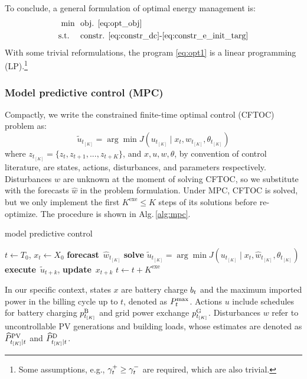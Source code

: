 To conclude, a general formulation of optimal energy management is:
\begin{subequations}\label{eq:opt1}
    \begin{align}
        \min~~ & \text{obj. \eqref{eq:opt_obj}}\\
        \text{s.t.~~~~} & \text{constr. \eqref{eq:constr_dc}-\eqref{eq:constr_e_init_targ}}
    \end{align}
\end{subequations}
With some trivial reformulations, the program \eqref{eq:opt1} is a linear programming (LP).\footnote{Some assumptions, e.g., $\gamma^+_t \ge \gamma^-_t$ are required, which are also trivial.}

\subsubsection{Model predictive control (MPC)} %

Compactly, we write the constrained finite-time optimal control (CFTOC) problem as:
\begin{equation}
    \widetilde{u}_{t_{[K]}} = \arg\min J(u_{t_{[K]}} \mid x_t, w_{t_{[K]}}, \theta_{t_{[K]}})
\end{equation}
where $z_{t_{[K]}} = \{z_t, z_{t+1}, ..., z_{t+K}\}$, and $x, u, w, \theta$, by convention of control literature, are states, actions, disturbances, and parameters respectively. Disturbances $w$ are unknown at the moment of solving CFTOC, so we substitute with the forecasts $\hat{w}$ in the problem formulation. Under MPC, CFTOC is solved, but we only implement the first $K^\text{exe} \le K$ steps of its solutions before re-optimize. The procedure is shown in Alg.\,\ref{alg:mpc}.  
\begin{algorithm}
\caption{model predictive control}\label{alg:mpc}
\begin{algorithmic}
\STATE $t \gets T_0$, $x_t \gets X_0$
\STATE \textbf{forecast}~$\widehat{w}_{t_{[K]}}$
\STATE \textbf{solve} $\widetilde{u}_{t_{[K]}} = \arg\min J(u_{t_{[K]}} \mid x_t, \widehat{w}_{t_{[K]}}, \theta_{t_{[K]}})$
    \STATE \textbf{execute}~$\widetilde{u}_{t+k}$, \textbf{update}~$x_{t+k}$
\ENDFOR
\STATE $t \gets t + K^\text{exe}$
\ENDWHILE
\end{algorithmic}
\end{algorithm}

In our specific context, states $x$ are battery charge $b_t$ and the maximum imported power in the billing cycle up to $t$, denoted as $P^{\max}_t$. Actions $u$ include schedules for battery charging $p^\text{B}_{t_{[K]}}$ and grid power exchange $p^{\text{G}}_{t_{[K]}}$. Disturbances $w$ refer to uncontrollable PV generations and building loads, whose estimates are denoted as $\widehat{P}^\text{PV}_{t_{[K]} \mid t}$ and $\widehat{P}^\text{D}_{t_{[K]} \mid t}$.

